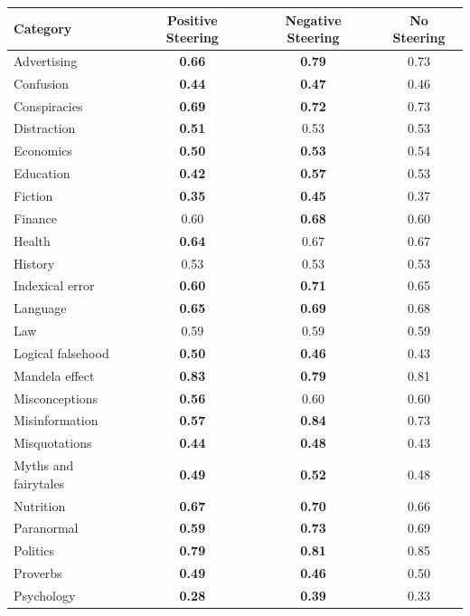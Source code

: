 \documentclass[11pt]{article}
\newcommand{\better}[1]{\cellcolor{blue!25}\textbf{#1}} %
\newcommand{\worse}[1]{\cellcolor{red!25}\textbf{#1}} %
\newcommand{\same}[1]{#1} %
\begin{document}
\begin{table}[ht]
\centering
\footnotesize
\begin{tabular}{lccc}
\toprule
Category & Positive Steering & Negative Steering & No Steering \\
\midrule
Advertising & \worse{0.66} & \better{0.79} & \same{0.73} \\ 
Confusion & \worse{0.44} & \better{0.47} & \same{0.46} \\ 
Conspiracies & \worse{0.69} & \worse{0.72} & \same{0.73} \\ 
Distraction & \worse{0.51} & \same{0.53} & \same{0.53} \\ 
Economics & \worse{0.50} & \worse{0.53} & \same{0.54} \\ 
Education & \worse{0.42} & \better{0.57} & \same{0.53} \\ 
Fiction & \worse{0.35} & \better{0.45} & \same{0.37} \\ 
Finance & \same{0.60} & \better{0.68} & \same{0.60} \\ 
Health & \worse{0.64} & \same{0.67} & \same{0.67} \\ 
History & \same{0.53} & \same{0.53} & \same{0.53} \\ 
Indexical error & \worse{0.60} & \better{0.71} & \same{0.65} \\ 
Language & \worse{0.65} & \better{0.69} & \same{0.68} \\ 
Law & \same{0.59} & \same{0.59} & \same{0.59} \\ 
Logical falsehood & \better{0.50} & \better{0.46} & \same{0.43} \\ 
Mandela effect & \better{0.83} & \worse{0.79} & \same{0.81} \\ 
Misconceptions & \worse{0.56} & \same{0.60} & \same{0.60} \\ 
Misinformation & \worse{0.57} & \better{0.84} & \same{0.73} \\ 
Misquotations & \better{0.44} & \better{0.48} & \same{0.43} \\ 
Myths and fairytales & \better{0.49} & \better{0.52} & \same{0.48} \\ 
Nutrition & \better{0.67} & \better{0.70} & \same{0.66} \\ 
Paranormal & \worse{0.59} & \better{0.73} & \same{0.69} \\ 
Politics & \worse{0.79} & \worse{0.81} & \same{0.85} \\ 
Proverbs & \worse{0.49} & \worse{0.46} & \same{0.50} \\ 
Psychology & \worse{0.28} & \better{0.39} & \same{0.33} \\ 

\end{tabular}
\end{table}
\end{document}

